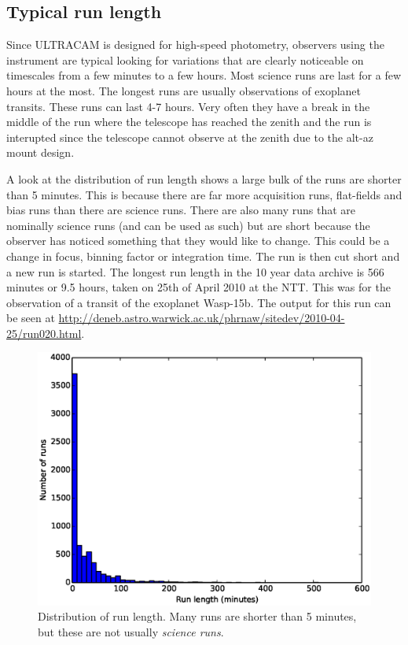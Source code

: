 \subsection{Typical run length}
Since ULTRACAM is designed for high-speed photometry, observers using the instrument are typical looking for variations that are clearly noticeable on timescales from a few minutes to a few hours. Most science runs are last for a few hours at the most. The longest runs are usually observations of exoplanet transits. These runs can last 4-7 hours. Very often they have a break in the middle of the run where the telescope has reached the zenith and the run is interupted since the telescope cannot observe at the zenith due to the alt-az mount design.  

A look at the distribution of run length shows a large bulk of the runs are shorter than 5 minutes. This is because there are far more acquisition runs, flat-fields and bias runs than there are science runs. There are also many runs that are nominally science runs (and can be used as such) but are short because the observer has noticed something that they would like to change. This could be a change in focus, binning factor or integration time. The run is then cut short and a new run is started. The longest run length in the 10 year data archive is 566 minutes or 9.5 hours, taken on 25th of April 2010 at the NTT. This was for the observation of a transit of the exoplanet Wasp-15b. The output for this run can be seen at \url{http://deneb.astro.warwick.ac.uk/phrnaw/sitedev/2010-04-25/run020.html}. 

\begin{figure}[!h]
  \centering
  \includegraphics[width=120mm]{images/hist0-600.eps}
  \caption{Distribution of run length. Many runs are shorter than 5 minutes, but these are not usually \emph{science runs}.}
  \label{fig:histogram0-600}
\end{figure}

